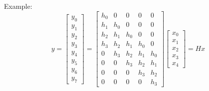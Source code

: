 Example:
\[
	y =
	\begin{bmatrix}
		y_0 \\
		y_1 \\
		y_2 \\
		y_3 \\
		y_4 \\
		y_5 \\
		y_6 \\
		y_7
	\end{bmatrix}
	= \begin{bmatrix}
		h_0	& 0		& 0		& 0		& 0 \\
		h_1	& h_0	& 0 	& 0 	& 0 \\
		h_2	& h_1	& h_0	& 0		& 0 \\
		h_3 & h_2	& h_1	& h_0	& 0 \\
		0	& h_3	& h_2	& h_1	& h_0 \\
		0	& 0		& h_3	& h_2	& h_1 \\
		0	& 0		& 0		& h_3	& h_2 \\
		0	& 0		& 0		& 0		& h_3	 
	  \end{bmatrix}
	  \begin{bmatrix}
	  	x_0 \\
	  	x_1 \\
	  	x_2 \\
	  	x_3 \\
	  	x_4
	  \end{bmatrix}
	= Hx
\]
\resetArrayStretch


